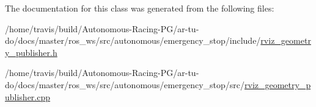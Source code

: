 The documentation for this class was generated from the following files\+:\begin{DoxyCompactItemize}
\item 
/home/travis/build/\+Autonomous-\/\+Racing-\/\+P\+G/ar-\/tu-\/do/docs/master/ros\+\_\+ws/src/autonomous/emergency\+\_\+stop/include/\hyperlink{emergency__stop_2include_2rviz__geometry__publisher_8h}{rviz\+\_\+geometry\+\_\+publisher.\+h}\item 
/home/travis/build/\+Autonomous-\/\+Racing-\/\+P\+G/ar-\/tu-\/do/docs/master/ros\+\_\+ws/src/autonomous/emergency\+\_\+stop/src/\hyperlink{emergency__stop_2src_2rviz__geometry__publisher_8cpp}{rviz\+\_\+geometry\+\_\+publisher.\+cpp}\end{DoxyCompactItemize}
